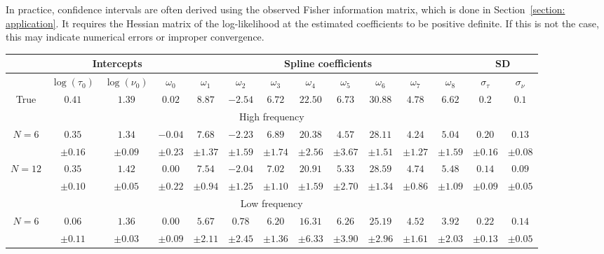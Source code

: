 \documentclass[aoas]{imsart}
\theoremstyle{definition}
\theoremstyle{remark}
\theoremstyle{remark}
\newcommand {\1}{\mathbb{1}}
\begin{document}
In practice, confidence intervals are often derived using the observed Fisher information matrix, which is done in Section~\ref{section: application}. 
It requires the Hessian matrix of the log-likelihood at the estimated coefficients to be positive definite. If this is not the case, this may indicate numerical errors or improper convergence.

\begin{landscape}
	
	\begin{table}
		\centering
		\begin{tabular}{|c|c|c|c|c|c|c|c|c|c|c|c|c|c|}
			\hline
			&\multicolumn{3}{|c|}{Intercepts} & \multicolumn{8}{|c|}{Spline coefficients} & \multicolumn{2}{|c|}{SD} \\
			\hline
			&$\log(\tau_0)$ & $\log(\nu_0)$ & $\omega_0$ & $\omega_1$ & $\omega_2$ & $\omega_3$ & $\omega_4$  & $\omega_5$ & $\omega_6$ & $\omega_7$ & $\omega_8$ & $\sigma_{\tau}$ & $\sigma_{\nu}$ \\
			\hline 
			True & $0.41$ & $1.39$ & $0.02$ & $8.87$& $-2.54$& $6.72$&
			$22.50$& $6.73$& $30.88$& $4.78$& $6.62$& $0.2$ & $0.1$ \\
			\hline
			\multicolumn{14}{|c|}{High frequency} \\
			\hline
			\multirow{2}{4em}{$N=6$} & $0.35$ &
			$1.34$ &
			$-0.04$ &
			$7.68$&
			$-2.23$&
			$6.89$&
			$20.38$&
			$4.57$&
			$28.11$&
			$4.24$&
			$5.04$&
			
			$0.20$&
			$0.13$
			
			\\
			&	$\pm 0.16$ &
			$\pm 0.09$&
			$\pm 0.23$ & $\pm 1.37$ &
			$\pm 1.59$ &
			$\pm 1.74$ &
			$\pm 2.56$ &
			$\pm 3.67$ &
			$\pm 1.51$ &
			$\pm 1.27$ &
			$\pm 1.59$ 
			& $\pm 0.16$ &
			$\pm 0.08$
			\\
			\hline
			\multirow{2}{4em}{$N=12$} & $0.35$ &
			$1.42$ & $0.00$ & $7.54$&
			$-2.04$ &
			$7.02$ &
			$20.91$ &
			$5.33$ &
			$28.59$ &
			$4.74$ &
			$5.48$ 
			
			& $0.14$ &
			$0.09$ 
			
			\\
			& $ \pm 0.10$ &
			$ \pm0.05$ &
			$\pm 0.22$ &
			$\pm 0.94$ &
			$\pm 1.25$ &
			$\pm 1.10$ &
			$\pm 1.59$ &
			$\pm 2.70$ &
			$\pm 1.34$ &
			$\pm 0.86$ &
			$\pm 1.09$ &
			
			$\pm 0.09$ &
			$\pm 0.05$ 
			\\
			\hline	
			\multicolumn{14}{|c|}{Low frequency} \\
			\hline
			\multirow{2}{4em}{$N=6$}  & $0.06$ &
			$1.36$ &
			$0.00$ & $5.67$ &
			$0.78$&
			$6.20$ &
			$16.31$ &
			$6.26$ &
			$25.19$ &
			$4.52$ &
			$3.92$ &
			$0.22$ &
			$0.14$
			\\
			& $\pm 0.11$ &
			$\pm 0.03$ &
			$\pm 0.09$ & 
			$\pm 2.11$ &
			$\pm 2.45$ &
			$\pm 1.36$ &
			$\pm 6.33$ &
			$\pm 3.90$ &
			$\pm 2.96$ &
			$\pm 1.61$ &
			$\pm 2.03$ &
			$\pm 0.13$ &
			$\pm 0.05$ 
			

\end{tabular}
\end{table}
\end{landscape}
\end{document}
